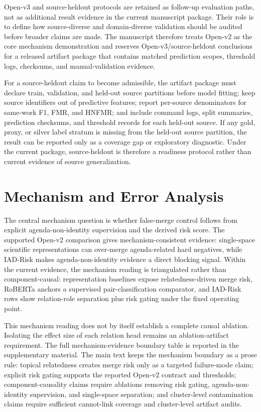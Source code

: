 \documentclass[preprint,12pt]{elsarticle}
\begin{document}
Open-v3 and source-heldout protocols are retained as follow-up evaluation paths, not as additional result evidence in the current manuscript package. Their role is to define how source-diverse and domain-diverse validation should be audited before broader claims are made. The manuscript therefore treats Open-v2 as the core mechanism demonstration and reserves Open-v3/source-heldout conclusions for a released artifact package that contains matched prediction scopes, threshold logs, checksums, and manual-validation evidence.

For a source-heldout claim to become admissible, the artifact package must declare train, validation, and held-out source partitions before model fitting; keep source identifiers out of predictive features; report per-source denominators for same-work F1, FMR, and HNFMR; and include command logs, split summaries, prediction checksums, and threshold records for each held-out source. If any gold, proxy, or silver label stratum is missing from the held-out source partition, the result can be reported only as a coverage gap or exploratory diagnostic. Under the current package, source-heldout is therefore a readiness protocol rather than current evidence of source generalization.

\section{Mechanism and Error Analysis}

The central mechanism question is whether false-merge control follows from explicit agenda-non-identity supervision and the derived risk score. The supported Open-v2 comparison gives mechanism-consistent evidence: single-space scientific representations can over-merge agenda-related hard negatives, while IAD-Risk makes agenda-non-identity evidence a direct blocking signal. Within the current evidence, the mechanism reading is triangulated rather than component-causal: representation baselines expose relatedness-driven merge risk, RoBERTa anchors a supervised pair-classification comparator, and IAD-Risk rows show relation-role separation plus risk gating under the fixed operating point.

This mechanism reading does not by itself establish a complete causal ablation. Isolating the effect size of each relation head remains an ablation-artifact requirement. The full mechanism-evidence boundary table is reported in the supplementary material. The main text keeps the mechanism boundary as a prose rule: topical relatedness creates merge risk only as a targeted failure-mode claim; explicit risk gating supports the reported Open-v2 contract and thresholds; component-causality claims require ablations removing risk gating, agenda-non-identity supervision, and single-space separation; and cluster-level contamination claims require sufficient cannot-link coverage and cluster-level artifact audits.
\end{document}
